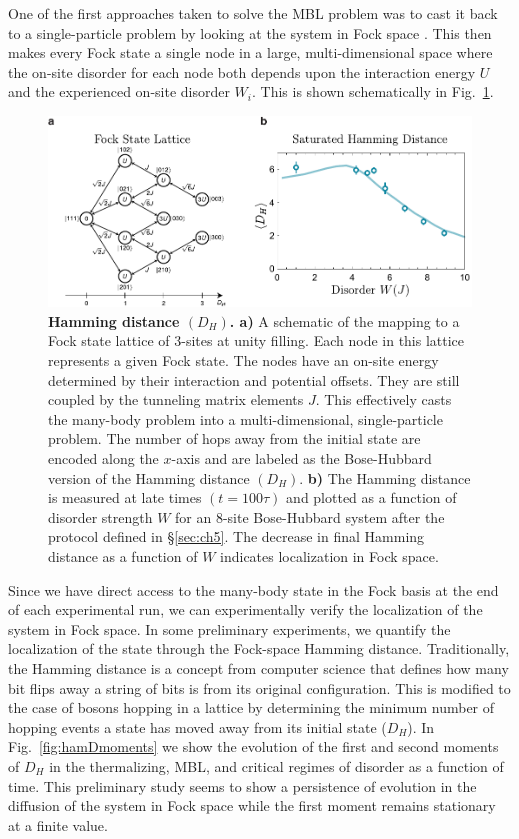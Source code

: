 One of the first approaches taken to solve the MBL problem was to cast it back to a single-particle problem by looking at the system in Fock space \cite{Altshuler1997,Alet2018}. This then makes every Fock state a single node in a large, multi-dimensional space where the on-site disorder for each node both depends upon the interaction energy $U$ and the experienced on-site disorder $W_i$. This is shown schematically in Fig.~\ref{fig:hamD}.

\begin{figure}[t!]
		\includegraphics[width=\columnwidth]{figures/ch7/hamming_dist_fig.pdf} 
		\caption{\textbf{Hamming distance $(D_H)$. a)} A schematic of the mapping to a Fock state lattice of $3$-sites at unity filling. Each node in this lattice represents a given Fock state. The nodes have an on-site energy determined by their interaction and potential offsets. They are still coupled by the tunneling matrix elements $J$. This effectively casts the many-body problem into a multi-dimensional, single-particle problem. The number of hops away from the initial state are encoded along the $x$-axis and are labeled as the Bose-Hubbard version of the Hamming distance $(D_H)$. \textbf{b)} The Hamming distance is measured at late times  $(t=100\tau)$ and plotted as a function of disorder strength $W$ for an $8$-site Bose-Hubbard system after the  protocol defined in \S \ref{sec:ch5}.  The decrease in final Hamming distance as a function of $W$ indicates  localization in Fock space.}
		\label{fig:hamD}	
\end{figure}

Since we have direct access to the many-body state in the Fock basis at the end of each experimental run, we can experimentally verify the localization of the system in Fock space. In some preliminary experiments, we quantify the localization of the state through the Fock-space Hamming distance. Traditionally, the Hamming distance is a concept from computer science that defines how many bit flips away a string of bits is from its original configuration. This is modified to the case of bosons hopping in a lattice by determining the minimum number of hopping events a state has moved away from its initial state ($D_H$). In Fig.~\ref{fig:hamDmoments} we show the evolution of the first and second moments of $D_H$ in the thermalizing, MBL, and critical regimes of disorder as a function of time. This preliminary study seems to show a persistence of evolution in the diffusion of the system in Fock space while the first moment remains stationary at a finite value.

